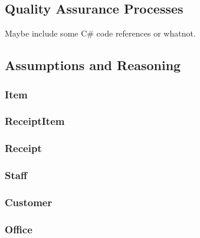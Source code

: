 \documentclass{article}
\begin{document}

        \subsection{Quality Assurance Processes}
        \label{sec:QAP}
            Maybe include some C\# code references or whatnot.

        \newpage
        \subsection{Assumptions and Reasoning}
        \label{sec:AR}
            \subsubsection{Item}

            \subsubsection{ReceiptItem}

            \subsubsection{Receipt}

            \subsubsection{Staff}

            \subsubsection{Customer}

            \subsubsection{Office}

\end{document}
